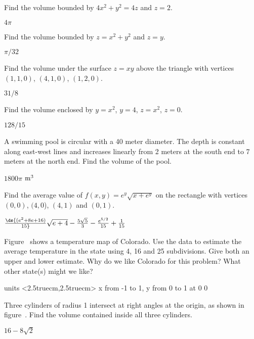 \begin{exercises}
\exercise Find the volume bounded by $4x^2+y^2=4z$ and $z=2$.
\begin{answer} $4\pi$
\end{answer}

\exercise Find the volume bounded by $z=x^2+y^2$ and $z=y$.
\begin{answer} $\pi/32$
\end{answer}

\exercise Find the volume under the surface $z=xy$ above the triangle
with vertices $(1,1,0)$, $(4,1,0)$, $(1,2,0)$.
\begin{answer} $31/8$
\end{answer}

\exercise Find the volume enclosed by $y=x^2$, $y=4$, $z=x^2$, $z=0$.
\begin{answer} $128/15$
\end{answer}

\exercise A swimming pool is circular with a 40 meter diameter.  The
depth is constant along east-west lines and increases linearly from 2
meters at the south end to 7 meters at the north end.  Find the volume
of the pool.  
\begin{answer} $1800\pi$ ${\rm m}^3$ 
\end{answer}


\exercise Find the average value of $f(x,y)=e^y\sqrt{x+e^y}$ on the
    rectangle with vertices $(0,0)$, $(4,0$), $(4,1)$ and $(0,1)$.
\begin{answer} $\ds{(e^2+8e+16)\over15}\sqrt{e+4}-{5\sqrt5\over3}-{e^{5/2}\over15}
+{1\over15}$
\end{answer}


\exercise Figure~ shows a temperature map
of Colorado.  Use the data to estimate the average temperature in the
state using 4, 16 and 25 subdivisions.  Give both an upper and lower
estimate.  Why do we like Colorado for this problem?  What other
state(s) might we like?

\figure
\vbox{\beginpicture
\setcoordinatesystem units <2.5truecm,2.5truecm>
\setplotarea x from -1 to 1, y from 0 to 1
 at 0 0
\endpicture}

\exercise Three cylinders of radius 1 intersect at right angles at the
origin, as shown in figure~. Find the
volume contained inside all three cylinders.
\begin{answer} $16-8\sqrt{2}$
\end{answer}


\end{exercises}
